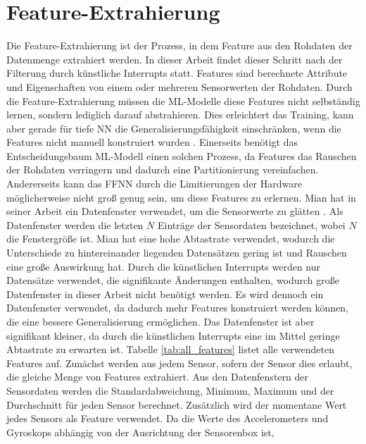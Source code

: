 \section{Feature-Extrahierung}
Die Feature-Extrahierung ist der Prozess, in dem Feature aus den Rohdaten der Datenmenge extrahiert werden.
In dieser Arbeit findet dieser Schritt nach der Filterung durch künstliche Interrupts statt.
Features sind berechnete Attribute und Eigenschaften von einem oder mehreren Sensorwerten der Rohdaten.
\newpage
Durch die Feature-Extrahierung müssen die ML-Modelle diese Features nicht selbständig lernen, sondern lediglich darauf abstrahieren.
Dies erleichtert das Training, kann aber gerade für tiefe NN die Generalisierungsfähigkeit einschränken,
wenn die Features nicht manuell konstruiert wurden \cite{seide2011feature}.
Einerseits benötigt das Entscheidungsbaum ML-Modell einen solchen Prozess,
da Features das Rauschen der Rohdaten verringern und dadurch eine Partitionierung vereinfachen.
Andererseits kann das FFNN durch die Limitierungen der Hardware möglicherweise nicht groß genug sein, um diese Features zu erlernen.
\newline
\newline
Mian hat in seiner Arbeit ein Datenfenster verwendet, um die Sensorwerte zu glätten \cite{naveedThesis}.
Als Datenfenster werden die letzten $N$ Einträge der Sensordaten bezeichnet, wobei $N$ die Fenstergröße ist.
Mian hat eine hohe Abtastrate verwendet, wodurch die Unterschiede zu hintereinander liegenden Datensätzen gering ist und Rauschen eine große Auswirkung hat.
Durch die künstlichen Interrupts werden nur Datensätze verwendet, die signifikante Änderungen enthalten,
wodurch große Datenfenster in dieser Arbeit nicht benötigt werden.
Es wird dennoch ein Datenfenster verwendet, da dadurch mehr Features konstruiert werden können, die eine bessere Generalisierung ermöglichen.
Das Datenfenster ist aber signifikant kleiner, da durch die künstlichen Interrupts eine im Mittel geringe Abtastrate zu erwarten ist.
\newline
\newline
Tabelle \ref{tab:all_features} listet alle verwendeten Features auf.
Zunächst werden aus jedem Sensor, sofern der Sensor dies erlaubt, die gleiche Menge von Features extrahiert.
Aus den Datenfenstern der Sensordaten werden die Standardabweichung, Minimum, Maximum und der Durchschnitt für jeden Sensor berechnet.
Zusätzlich wird der momentane Wert jedes Sensors als Feature verwendet.
Da die Werte des Accelerometers und Gyroskops abhängig von der Ausrichtung der Sensorenbox ist,
